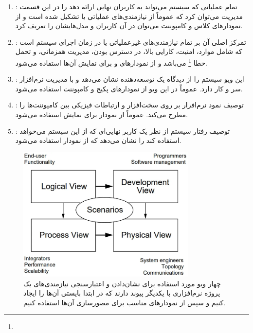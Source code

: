\documentclass[a4paper]{article}
\begin{document}
\begin{enumerate}
    \item {}: تمام عملیاتی که سیستم می‌تواند به کاربران نهایی
    ارائه دهد را در این قسمت مدیریت  می‌توان کرد ‌که عموماً از نیازمندی‌های
    عملیاتی یا  تشکیل شده است و از نمودار‌های کلاس و
    کامپوننت می‌توان در آن کاربران و مدل‌هایشان را تعریف کرد.
    \item {}: تمرکز اصلی آن بر تمام نیازمندی‌های غیرعملیاتی یا
     در زمان اجرای سیستم است که شامل موارد،
    امنیت، کارایی بالا، در دسترس بودن، مدیریت همزمانی، و تحمل خطا
    \footnote{} می‌باشد و از نمودار‌های  و
     برای نمایش آن‌ها استفاده می‌شود.
    \item {}: این ویو سیستم را از دیدگاه یک توسعه‌دهنده نشان
    می‌دهد و با مدیریت نرم‌افزار سر و کار دارد. عموماً در این ویو از نمودار‌های
    پکیج و کامپوننت استفاده می‌شود.
    \item {}: توصیف نمود نرم‌افزار بر روی سخت‌افزار و ارتباطات
    فیزیکی بین کامپوننت‌ها را مطرح می‌کند. عموماً از نمودار  برای
    نمایش استفاده می‌شود.
    \item {}: توصیف رفتار سیستم از نظر یک کاربر نهایی‌ای که از این
    سیستم می‌خواهد استفاده کند را نشان می‌دهد که از نمودار  استفاده
    می‌شود. 
\end{enumerate}

\begin{figure}[H]
    \centering
    \caption{چهار ویو مورد استفاده برای نشان‌دادن و اعتبارسنجی نیازمندی‌های یک
    پروژه نرم‌افزاری با یکدیگر پیوند دارند که در ابتدا بایستی آن‌ها را ایجاد
    کنیم و سپس از نمودار‌های مناسب برای مصور‌سازی آن‌ها استفاده کنیم.
    \cite{kruntchen1995architectural}}
    \includegraphics[width=0.8\textwidth]{diagrams/five_view.png}
\end{figure}
\end{document}
